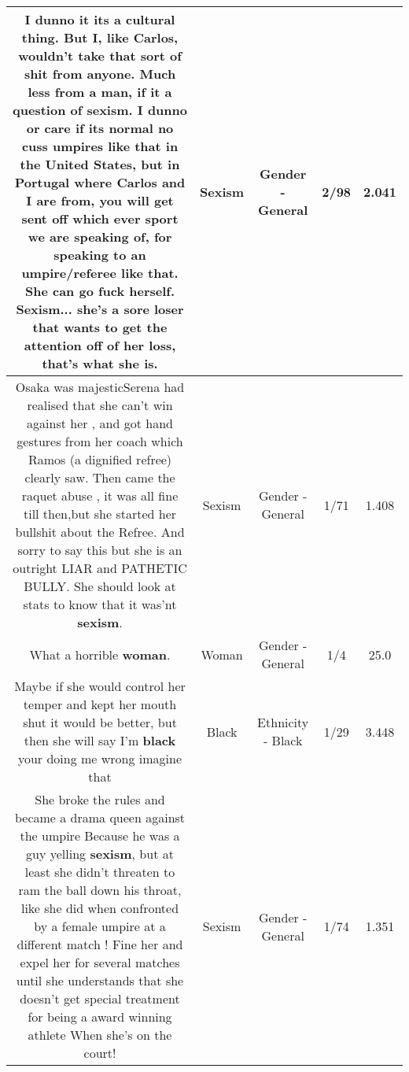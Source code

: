 \documentclass[11pt]{article}
\newlength\mylength
\begin{document}
\begin{center}
\begin{longtable}{|C{.65\mylength}|C{.30\mylength}|C{.12\mylength}|C{.12\mylength}|C{.12\mylength}|}
  \small I dunno it its a cultural thing. But I, like Carlos, wouldn't take that sort of shit from anyone. Much less from a man, if it a question of \textbf{sexism}. I dunno or care if its normal no cuss umpires like that in the United States, but in Portugal where Carlos and I are from, you will get sent off which ever sport we are speaking of, for speaking to an umpire/referee like that. She can go fuck herself. \textbf{Sexism}... she's a sore loser that wants to get the attention off of her loss, that's what she is.\normalsize   & Sexism & Gender - General & 2/98 & 2.041 \\  \hline
  \small Osaka was majesticSerena had realised that she can't win against her , and got hand gestures from her coach which Ramos (a dignified refree) clearly saw. Then came the raquet abuse , it was all fine till then,but she started her bullshit about the Refree. And sorry to say this but she is an outright LIAR and PATHETIC BULLY. She should look at stats to know that it was'nt \textbf{sexism}.\normalsize   & Sexism & Gender - General & 1/71 & 1.408 \\  \hline
  \small What a horrible \textbf{woman}.\normalsize   & Woman & Gender - General & 1/4 & 25.0 \\  \hline
  \small Maybe if she would control her temper and kept her mouth shut it would be better, but then she will say I'm \textbf{black} your doing me wrong imagine that\normalsize   & Black & Ethnicity - Black & 1/29 & 3.448 \\  \hline
  \small She broke the rules and became a drama queen against the umpire Because he was a guy yelling \textbf{sexism}, but at least she didn't threaten to ram the ball down his throat, like she did when confronted by a female umpire at a different match ! Fine her and expel her for several matches until she understands that she doesn't get special treatment for being a award winning athlete When she's on the court!\normalsize   & Sexism & Gender - General & 1/74 & 1.351 \\  \hline

\end{longtable}
\end{center}
\end{document}

